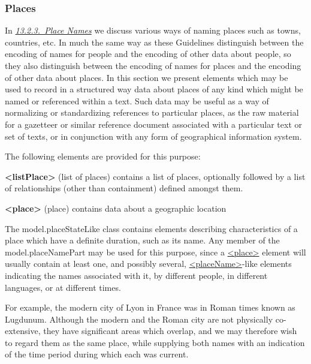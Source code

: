 \subsubsection[{Places}]{Places}\label{NDGEOG}\par
In \textit{\hyperref[NDPLAC]{13.2.3.\ Place Names}} we discuss various ways of naming places such as towns, countries, etc. In much the same way as these Guidelines distinguish between the encoding of names for people and the encoding of other data about people, so they also distinguish between the encoding of names for places and the encoding of other data about places. In this section we present elements which may be used to record in a structured way data about places of any kind which might be named or referenced within a text. Such data may be useful as a way of normalizing or standardizing references to particular places, as the raw material for a gazetteer or similar reference document associated with a particular text or set of texts, or in conjunction with any form of geographical information system.\par
The following elements are provided for this purpose: 
\begin{sansreflist}
  
\item [\textbf{<listPlace>}] (list of places) contains a list of places, optionally followed by a list of relationships (other than containment) defined amongst them.
\item [\textbf{<place>}] (place) contains data about a geographic location
\end{sansreflist}
\par
The \textsf{model.placeStateLike} class contains elements describing characteristics of a place which have a definite duration, such as its name. Any member of the \textsf{model.placeNamePart} may be used for this purpose, since a \hyperref[TEI.place]{<place>} element will usually contain at least one, and possibly several, \hyperref[TEI.placeName]{<placeName>}-like elements indicating the names associated with it, by different people, in different languages, or at different times.\par
For example, the modern city of Lyon in France was in Roman times known as Lugdunum. Although the modern and the Roman city are not physically co-extensive, they have significant areas which overlap, and we may therefore wish to regard them as the same place, while supplying both names with an indication of the time period during which each was current.\par
